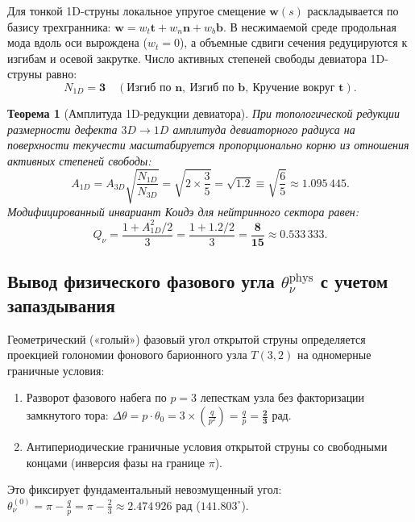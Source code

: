 \documentclass[11pt,a4paper]{article}
\newtheorem{theorem}{Теорема}[section]
\theoremstyle{definition}
\theoremstyle{remark}
\begin{document}
Для тонкой 1D-струны локальное упругое смещение $\mathbf{w}(s)$ раскладывается по базису трехгранника: $\mathbf{w} = w_t \mathbf{t} + w_n \mathbf{n} + w_b \mathbf{b}$. В несжимаемой среде продольная мода вдоль оси вырождена ($w_t = 0$), а объемные сдвиги сечения редуцируются к изгибам и осевой закрутке. Число активных степеней свободы девиатора 1D-струны равно:
\begin{equation}
	N_{1D} = \mathbf{3} \quad (\text{Изгиб по } \mathbf{n}, \ \text{Изгиб по } \mathbf{b}, \ \text{Кручение вокруг } \mathbf{t}).
\end{equation}

\begin{theorem}[Амплитуда 1D-редукции девиатора]
	При топологической редукции размерности дефекта $3D \to 1D$ амплитуда девиаторного радиуса на поверхности текучести масштабируется пропорционально корню из отношения активных степеней свободы:
	\begin{equation}
		A_{1D} = A_{3D} \sqrt{\frac{N_{1D}}{N_{3D}}} = \sqrt{2 \times \frac{3}{5}} = \mathbf{\sqrt{1.2}} \equiv \sqrt{\frac{6}{5}} \approx 1.095\,445.
	\end{equation}
	Модифицированный инвариант Коидэ для нейтринного сектора равен:
	\begin{equation}
		Q_\nu = \frac{1 + A_{1D}^2 / 2}{3} = \frac{1 + 1.2/2}{3} = \mathbf{\frac{8}{15}} \approx 0.533\,333.
	\end{equation}
\end{theorem}

\subsection{Вывод физического фазового угла $\theta_\nu^{\text{phys}}$ с учетом запаздывания}
Геометрический («голый») фазовый угол открытой струны определяется проекцией голономии фонового барионного узла $T(3,2)$ на одномерные граничные условия:
\begin{enumerate}
	\item Разворот фазового набега по $p=3$ лепесткам узла без факторизации замкнутого тора: $\Delta \theta = p \cdot \theta_0 = 3 \times \left(\frac{q}{p^2}\right) = \frac{q}{p} = \mathbf{\frac{2}{3} \text{ рад}}$.
	\item Антипериодические граничные условия открытой струны со свободными концами (инверсия фазы на границе $\pi$).
\end{enumerate}
Это фиксирует фундаментальный невозмущенный угол: $\theta_\nu^{(0)} = \pi - \frac{q}{p} = \pi - \frac{2}{3} \approx 2.474\,926$ рад ($141.803^\circ$).
\end{document}

